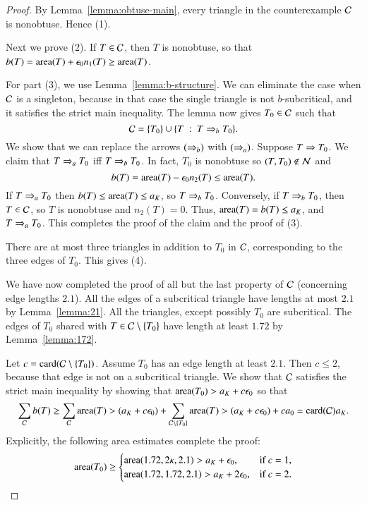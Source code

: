 \begin{proof}  By Lemma~\ref{lemma:obtuse-main},  every triangle in
  the counterexample $\mathcal C$ is nonobtuse.  Hence (1).


Next we prove (2).  If $T\in \mathcal C$, then $T$ is nonobtuse, so that $b(T)
= {\operatorname{area}}(T) + \epsilon_0 n_1(T)\ge {\operatorname{area}}(T)$.  

For part (3), we use Lemma~\ref{lemma:b-structure}.  We can eliminate
the case when $\mathcal C$ is a singleton, because in that case the single
triangle is not $b$-subcritical, and it satisfies the strict main
inequality.  The lemma now gives $T_0\in \mathcal C$ such that
\[\mathcal C = \{T_0\}\cup \{T \ :\ 
  T\Rightarrow_{b} T_0\}.
\]
We show that we can replace the arrows $(\Rightarrow_{b})$ with $(\Rightarrow_{a})$.
Suppose $T\Rightarrow T_0$.  We claim that $T\Rightarrow_{a} T_0$ iff $T\Rightarrow_{b} T_0$.
In fact, $T_0$ is nonobtuse so $(T,T_0)\not\in \mathcal N$ and
\[
b(T) = {\operatorname{area}}(T) - \epsilon_0 n_2(T) \le {\operatorname{area}}(T).
\]
If $T\Rightarrow_{a} T_0$ then $b(T)\le {\operatorname{area}}(T)\le a_K$, so $T\Rightarrow_{b} T_0$.
Conversely, if $T\Rightarrow_{b} T_0$, then $T\in \mathcal C$, so $T$ is nonobtuse and
$n_2(T) = 0$.  Thus, ${\operatorname{area}}(T) = b(T)\le a_K$, and $T\Rightarrow_{a}T_0$.  This
completes the proof of the claim and the proof of (3).

There are at most three triangles in addition to $T_0$ in $\mathcal C$,
corresponding to the three edges of $T_0$.  This gives (4).

We have now completed the proof of all but the last property of $\mathcal C$
(concerning edge lengths $2.1$).  All the edges of a subcritical
triangle have lengths at most $2.1$ by Lemma~\ref{lemma:21}.  All the
triangles, except possibly $T_0$ are subcritical.  The edges of $T_0$
shared with $T\in \mathcal C\setminus\{T_0\}$ have length at least $1.72$ by
Lemma~\ref{lemma:172}.

Let $c = {\operatorname{card}}(\mathcal C\setminus \{T_0\})$. Assume $T_0$ has an edge length
at least $2.1$.  Then $c\le 2$, because that edge is not on a
subcritical triangle.  We show that $\mathcal C$ satisfies the strict main
inequality by showing that ${\operatorname{area}}(T_0) > a_K + c \epsilon_0$ so that
\[
\sum_{\mathcal C} b(T) \ge \sum_{\mathcal C}{\operatorname{area}}(T) 
   > (a_K + c\epsilon_0) + \sum_{\mathcal C\setminus\{T_0\}}{\operatorname{area}}(T) > (a_K + c\epsilon_0) + c a_0
 = {\operatorname{card}}(\mathcal C) a_K.
\]
Explicitly,  the following area estimates complete the proof:
\[
{\operatorname{area}}(T_0)\ge \begin{cases}
{\operatorname{area}}(1.72,2\kappa,2.1) > a_K+\epsilon_0,& \text{if } c = 1,\\
{\operatorname{area}}(1.72,1.72,2.1) > a_K+2\epsilon_0,& \text{if } c = 2.
\end{cases}
\] %
\end{proof}

